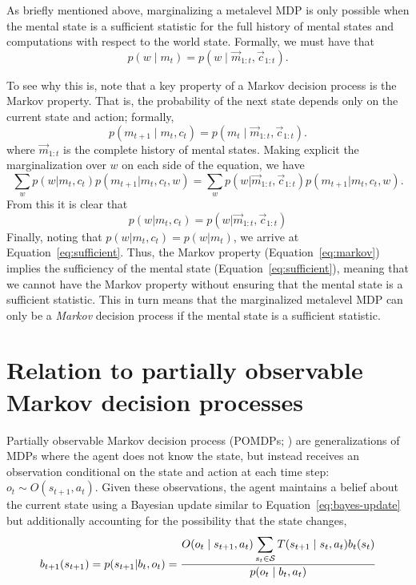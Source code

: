 As briefly mentioned above, marginalizing a metalevel MDP is only possible when the mental state is a sufficient statistic for the full history of mental states and computations with respect to the world state. Formally, we must have that
%
\begin{equation}\label{eq:sufficient}
  p(w \mid m_t) = p(w \mid \vec{m}_{1:t}, \vec{c}_{1:t}).
\end{equation}
%

To see why this is, note that a key property of a Markov decision process is the Markov property. That is, the probability of the next state depends only on the current state and action; formally,
\begin{equation}\label{eq:markov}
  p(m_{t+1} \mid m_t, c_t) = p(m_t \mid \vec{m}_{1:t}, \vec{c}_{1:t}).
\end{equation}
where $\vec{m}_{1:t}$ is the complete history of mental states. Making explicit the marginalization over $w$ on each side of the equation, we have
\begin{equation}
  \sum_w p(w | m_t, c_t) p(m_{t+1} | m_t, c_t, w) =
  \sum_w p(w | \vec{m}_{1:t}, \vec{c}_{1:t}) p(m_{t+1} | m_t, c_t, w).
\end{equation}
From this it is clear that 
%
\begin{equation}
  p(w | m_t, c_t) = p(w | \vec{m}_{1:t}, \vec{c}_{1:t})
\end{equation}
%
Finally, noting that $p(w | m_t, c_t) = p(w | m_t)$, we arrive at Equation~\ref{eq:sufficient}. Thus, the Markov property (Equation~\ref{eq:markov}) implies the sufficiency of the mental state (Equation~\ref{eq:sufficient}), meaning that we cannot have the Markov property without ensuring that the mental state is a sufficient statistic. This in turn means that the marginalized metalevel MDP can only be a \emph{Markov} decision process if the mental state is a sufficient statistic.

\section{Relation to partially observable Markov decision processes}

Partially observable Markov decision process (POMDPs; \citealp{kaelbling1998planningb}) are generalizations of MDPs where the agent does not know the state, but instead receives an observation conditional on the state and action at each time step: $o_t \sim O(s_{t+1}, a_t)$. Given these observations, the agent maintains a belief about the current state using a Bayesian update similar to Equation~\ref{eq:bayes-update} but additionally accounting for the possibility that the state changes,
%
\begin{equation}\label{eq:pomdp-update}
  b_{t+1}(s_{t+1}) = p(s_{t+1} | b_t, o_t) = \frac{
    O(o_t \mid s_{t+1}, a_t) \displaystyle\sum_{s_t \in \S} T(s_{t+1} \mid s_t, a_t) b_t(s_t)
  }{
    p(o_t \mid b_t, a_t)
  } 
\end{equation}
%

